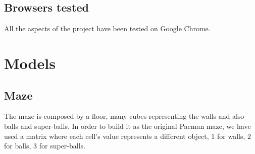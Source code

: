 \documentclass[a4paper,oneside]{report}
\begin{document}
\section{Browsers tested}
All the aspects of the project have been tested on Google Chrome.
\chapter{Models}
\section{Maze}
The maze is composed by a floor, many cubes representing the walls and also balls and super-balls. In order to build it as the original Pacman maze, we have used a matrix where each cell's value represents a different object, 1 for walls, 2 for balls, 3 for super-balls.
\end{document}
